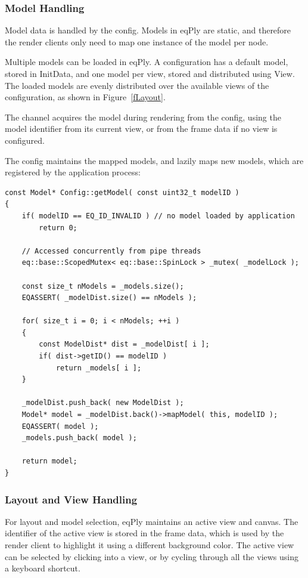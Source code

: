 \documentclass[10pt,a4]{scrartcl}
\newcommand{\fig}[1]{Figure~\ref{#1}}
\begin{document}
\subsubsection{Model Handling}

Model data is handled by the config. Models in eqPly are static,
and therefore the render clients only need to map one instance of the
model per node.

Multiple models can be loaded in \textsf{eqPly}. A configuration has a
default model, stored in \textsf{InitData}, and one model per view,
stored and distributed using \textsf{View}. The
loaded models are evenly distributed over the available views of the
configuration, as shown in \fig{fLayout}.

The channel acquires the model during rendering from the config, using
the model identifier from its current view, or from the frame data if
no view is configured.

The config maintains the mapped models, and lazily maps new models,
which are registered by the application process:

{\footnotesize\begin{lstlisting}
const Model* Config::getModel( const uint32_t modelID )
{
    if( modelID == EQ_ID_INVALID ) // no model loaded by application
        return 0;

    // Accessed concurrently from pipe threads
    eq::base::ScopedMutex< eq::base::SpinLock > _mutex( _modelLock );

    const size_t nModels = _models.size();
    EQASSERT( _modelDist.size() == nModels );

    for( size_t i = 0; i < nModels; ++i )
    {
        const ModelDist* dist = _modelDist[ i ];
        if( dist->getID() == modelID )
            return _models[ i ];
    }
    
    _modelDist.push_back( new ModelDist );
    Model* model = _modelDist.back()->mapModel( this, modelID );
    EQASSERT( model );
    _models.push_back( model );

    return model;
}
\end{lstlisting}}

\subsubsection{Layout and View Handling}

For layout and model selection, \textsf{eqPly} maintains an active view
and canvas. The identifier of the active view is stored in the frame
data, which is used by the render client to highlight it using a
different background color. The active view can be selected by clicking
into a view, or by cycling through all the views using a keyboard
shortcut.
\end{document}
